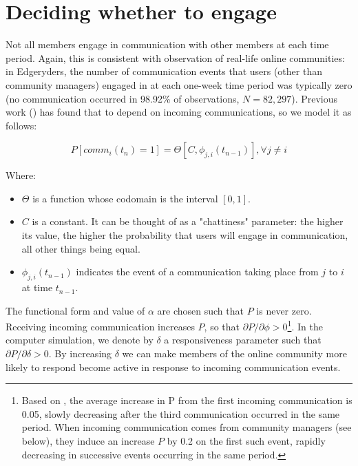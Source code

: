 \documentclass{article}
\begin{document}
\section{Deciding whether to engage}

Not all members engage in communication with other members at each time period. Again, this is consistent with observation of real-life online communities: in Edgeryders, the number of communication events that users (other than community managers) engaged in at each one-week time period was typically zero (no communication occurred in 98.92\% of observations, $N = 82,297$). Previous work (\cite{cottica2016microfoundations}) has found that to depend on incoming communications, so we model it as follows:

\begin{equation}
	P[comm_i(t_n) = 1] = \Theta [C, \phi_{j,i}(t_{n-1})], \forall j \neq i
	\label{eq:engageYesNo}
\end{equation}

Where:

\begin{itemize}
	\item $\Theta$ is a function whose codomain is the interval $[0,1]$.
	\item $C$ is a constant. It can  be thought of as a "chattiness" parameter: the higher its value, the higher the probability that users will engage in communication, all other things being equal.
	\item  $\phi_{j,i}(t_{n-1})$ indicates the event of a communication taking place from $j$ to $i$ at time $t_{n-1}$.
\end{itemize}

The functional form and value of $\alpha$ are chosen such that $P$ is never zero. Receiving incoming communication increases $P$, so that $\partial P / \partial  \phi > 0$\footnote{Based on \cite{cottica2016microfoundations}, the average increase in P from the first incoming communication is 0.05, slowly decreasing after the third communication occurred in the same period.  When incoming communication comes from community managers (see below), they induce an increase $P$ by 0.2 on the first such event, rapidly decreasing in successive events occurring in the same period. }. In the computer simulation, we denote by $\delta$ a responsiveness parameter such that $\partial P / \partial \delta > 0$. By increasing $\delta$ we can make members of the online community more likely to respond become active in response to incoming communication events. 
\end{document}
